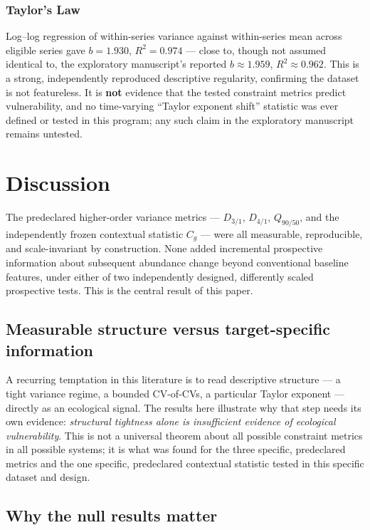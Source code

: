 \documentclass[11pt]{article}
\newcommand{\Dthreeone}{D_{3/1}}
\newcommand{\Dfourone}{D_{4/1}}
\newcommand{\Qninefifty}{Q_{90/50}}
\newcommand{\Cg}{C_g}
\begin{document}
\subsubsection{Taylor's Law}

Log--log regression of within-series variance against within-series mean
across eligible series gave $b=1.930$, $R^2=0.974$ --- close to, though
not assumed identical to, the exploratory manuscript's reported
$b\approx1.959$, $R^2\approx0.962$. This is a strong, independently
reproduced descriptive regularity, confirming the dataset is not
featureless. It is \textbf{not} evidence that the tested constraint
metrics predict vulnerability, and no time-varying ``Taylor exponent
shift'' statistic was ever defined or tested in this program; any such
claim in the exploratory manuscript remains untested.

\section{Discussion}

The predeclared higher-order variance metrics --- $\Dthreeone$,
$\Dfourone$, $\Qninefifty$, and the independently frozen contextual
statistic $\Cg$ --- were all measurable, reproducible, and scale-invariant
by construction. None added incremental prospective information about
subsequent abundance change beyond conventional baseline features, under
either of two independently designed, differently scaled prospective
tests. This is the central result of this paper.

\subsection{Measurable structure versus target-specific information}

A recurring temptation in this literature is to read descriptive
structure --- a tight variance regime, a bounded CV-of-CVs, a particular
Taylor exponent --- directly as an ecological signal. The results here
illustrate why that step needs its own evidence: \emph{structural
tightness alone is insufficient evidence of ecological vulnerability}.
This is not a universal theorem about all possible constraint metrics in
all possible systems; it is what was found for the three specific,
predeclared metrics and the one specific, predeclared contextual
statistic tested in this specific dataset and design.

\subsection{Why the null results matter}
\end{document}
